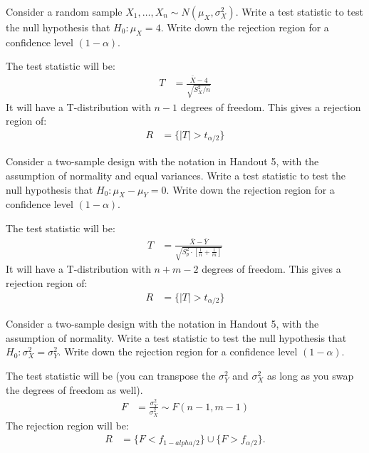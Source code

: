 
Consider a random sample $X_1, \ldots, X_n \sim N(\mu_X, \sigma^2_X)$. 
Write a test statistic to test the null hypothesis that $H_0: \mu_X = 4$.
Write down the rejection region for a confidence level 
$(1 - \alpha)$. 


The test statistic will be:
\begin{align*}
T &= \frac{\bar{X} - 4}{\sqrt{S^2_X / n}}
\end{align*}
It will have a T-distribution with $n-1$ degrees of freedom. This gives
a rejection region of:
\begin{align*}
R &= \{ |T| > t_{\alpha/2} \}
\end{align*}


Consider a two-sample design with the notation in Handout 5, with the assumption
of normality and equal variances. Write a test statistic to test the null
hypothesis that $H_0: \mu_X - \mu_Y = 0$. Write down the
rejection region for a confidence level  $(1 - \alpha)$.


The test statistic will be:
\begin{align*}
T &= \frac{\bar{X} - \bar{Y}}{\sqrt{S^2_p \cdot \left[ \frac{1}{n} + \frac{1}{m} \right]}}
\end{align*}
It will have a T-distribution with $n + m - 2$ degrees of freedom. This gives
a rejection region of:
\begin{align*}
R &= \{ |T| > t_{\alpha/2} \}
\end{align*}


Consider a two-sample design with the notation in Handout 5, with the assumption
of normality. Write a test statistic to test the null
hypothesis that $H_0: \sigma_X^2 = \sigma_Y^2$. Write down the
rejection region for a confidence level  $(1 - \alpha)$.


The test statistic will be (you can transpose the $\sigma_Y^2$
and $\sigma_X^2$ as long as you swap the degrees of freedom as
well).
\begin{align*}
F &= \frac{\sigma_Y^2}{\sigma_X^2} \sim F(n-1, m-1)
\end{align*}
The rejection region will be:
\begin{align*}
R &= \{ F < f_{1-alpha/2} \} \cup \{ F > f_{\alpha/2} \}.
\end{align*}
